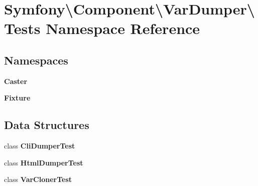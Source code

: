\section{Symfony\textbackslash{}Component\textbackslash{}Var\+Dumper\textbackslash{}Tests Namespace Reference}
\label{namespace_symfony_1_1_component_1_1_var_dumper_1_1_tests}
\subsection*{Namespaces}
\begin{DoxyCompactItemize}
\item 
 {\bf Caster}
\item 
 {\bf Fixture}
\end{DoxyCompactItemize}
\subsection*{Data Structures}
\begin{DoxyCompactItemize}
\item 
class {\bf Cli\+Dumper\+Test}
\item 
class {\bf Html\+Dumper\+Test}
\item 
class {\bf Var\+Cloner\+Test}
\end{DoxyCompactItemize}

